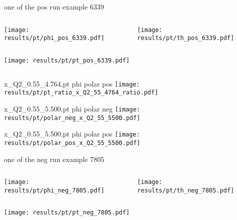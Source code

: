 \begin{frame}{one of the pos run example 6339}
\begin{columns}
\begin{column}[T]{0.5\textwidth}
\texttt{[image: results/pt/phi\_pos\_6339.pdf]}
\end{column}
\begin{column}[T]{0.5\textwidth}
\texttt{[image: results/pt/th\_pos\_6339.pdf]}
\end{column}
\end{columns}
\begin{columns}
\begin{column}[T]{0.5\textwidth}
\texttt{[image: results/pt/pt\_pos\_6339.pdf]}
\end{column}
\begin{column}[T]{0.5\textwidth}
\end{column}
\end{columns}
\end{frame}
\begin{frame}{x\_Q2\_0.55\_4.764,pt phi polar pos}
\texttt{[image: results/pt/pt\_ratio\_x\_Q2\_55\_4764\_ratio.pdf]}
\end{frame}
\begin{frame}{x\_Q2\_0.55\_5.500,pt phi polar neg}
\texttt{[image: results/pt/polar\_neg\_x\_Q2\_55\_5500.pdf]}
\end{frame}
\begin{frame}{x\_Q2\_0.55\_5.500,pt phi polar pos}
\texttt{[image: results/pt/polar\_pos\_x\_Q2\_55\_5500.pdf]}
\end{frame}
\begin{frame}{one of the neg run example 7805}
\begin{columns}
\begin{column}[T]{0.5\textwidth}
\texttt{[image: results/pt/phi\_neg\_7805.pdf]}
\end{column}
\begin{column}[T]{0.5\textwidth}
\texttt{[image: results/pt/th\_neg\_7805.pdf]}
\end{column}
\end{columns}
\texttt{[image: results/pt/pt\_neg\_7805.pdf]}
\end{frame}
